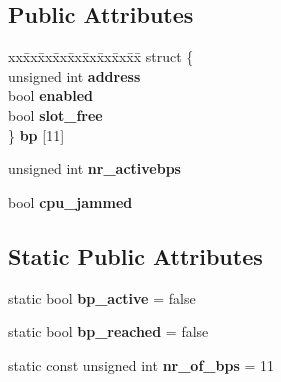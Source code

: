 \subsection*{Public Attributes}
\begin{DoxyCompactItemize}
\item 
\mbox{\label{class_c_p_u_aea1e18343c7fdb60c8be312e77904bbc}} 
\begin{tabbing}
xx\=xx\=xx\=xx\=xx\=xx\=xx\=xx\=xx\=\kill
struct \{\\
\>unsigned int {\bfseries address}\\
\>bool {\bfseries enabled}\\
\>bool {\bfseries slot\_free}\\
\} {\bfseries bp} \mbox{[}11\mbox{]}\\

\end{tabbing}\item 
\mbox{\label{class_c_p_u_a267c110e75137c82ebe098ac42f6a012}} 
unsigned int {\bfseries nr\+\_\+activebps}
\item 
\mbox{\label{class_c_p_u_aa3cd512148f8b3eb9a44daf247e93fdd}} 
bool {\bfseries cpu\+\_\+jammed}
\end{DoxyCompactItemize}
\subsection*{Static Public Attributes}
\begin{DoxyCompactItemize}
\item 
\mbox{\label{class_c_p_u_aa4e864695ffd420551762832176f158a}} 
static bool {\bfseries bp\+\_\+active} = false
\item 
\mbox{\label{class_c_p_u_a6f8035bb0299b69d320ee0c0976277b7}} 
static bool {\bfseries bp\+\_\+reached} = false
\item 
\mbox{\label{class_c_p_u_a70cee1b15339fd6a9a369e7bd71b1124}} 
static const unsigned int {\bfseries nr\+\_\+of\+\_\+bps} = 11
\end{DoxyCompactItemize}
